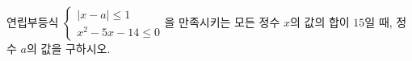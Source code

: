 연립부등식 $\begin{cases} |x-a|\le 1 \\ x^2-5x-14\le 0 \end{cases}$을 만족시키는 모든 정수 $x$의 값의 합이 $15$일 때, 정수 $a$의 값을 구하시오.
